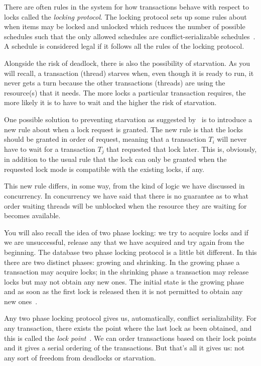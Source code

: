 \documentclass[a4paper]{report}
\begin{document}
There are often rules in the system for how transactions behave with respect to locks called the \textit{locking protocol}. The locking protocol sets up some rules about when items may be locked and unlocked which reduces the number of possible schedules such that the only allowed schedules are conflict-serializable schedules~\cite{dsc}. A schedule is considered legal if it follows all the rules of the locking protocol.

Alongside the risk of deadlock, there is also the possibility of starvation. As you will recall, a transaction (thread) starves when, even though it is ready to run, it never gets a turn because the other transactions (threads) are using the resource(s) that it needs. The more locks a particular transaction requires, the more likely it is to have to wait and the higher the risk of starvation.

One possible solution to preventing starvation as suggested by~\cite{dsc} is to introduce a new rule about when a lock request is granted. The new rule is that the locks should be granted in order of request, meaning that a transaction $T_{i}$ will never have to wait for a transaction $T_{j}$ that requested that lock later. This is, obviously, in addition to the usual rule that the lock can only be granted when the requested lock mode is compatible with the existing locks, if any.

This new rule differs, in some way, from the kind of logic we have discussed in concurrency. In concurrency we have said that there is no guarantee as to what order waiting threads will be unblocked when the resource they are waiting for becomes available.

You will also recall the idea of two phase locking: we try to acquire locks and if we are unsuccessful, release any that we have acquired and try again from the beginning. The database two phase locking protocol is a little bit different. In this there are two distinct phases: growing and shrinking. In the growing phase a transaction may acquire locks; in the shrinking phase a transaction may release locks but may not obtain any new ones. The initial state is the growing phase and as soon as the first lock is released then it is not permitted to obtain any new ones~\cite{dsc}.

Any two phase locking protocol gives us, automatically, conflict serializability. For any transaction, there exists the point where the last lock as been obtained, and this is called the \textit{lock point}~\cite{dsc}. We can order transactions based on their lock points and it gives a serial ordering of the transactions. But that's all it gives us: not any sort of freedom from deadlocks or starvation.
\end{document}

